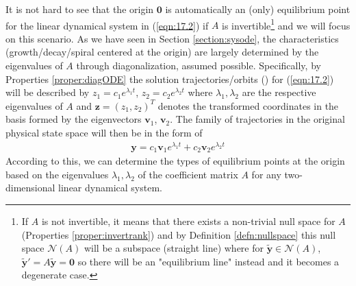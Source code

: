 It is not hard to see that the origin $\textbf{0}$ is automatically an (only) equilibrium point for the linear dynamical system in (\ref{eqn:17.2}) if $A$ is invertible\footnote{If $A$ is not invertible, it means that there exists a non-trivial null space for $A$ (Properties \ref{proper:invertrank}) and by Definition \ref{defn:nullspace} this null space $\mathcal{N}(A)$ will be a subspace (straight line) where for $\tilde{\textbf{y}} \in \mathcal{N}(A)$, $\tilde{\textbf{y}}' = A\tilde{\textbf{y}} = \textbf{0}$ so there will be an "equilibrium line" instead and it becomes a degenerate case.} and we will focus on this scenario. As we have seen in Section \ref{section:sysode}, the characteristics (growth/decay/spiral centered at the origin) are largely determined by the eigenvalues of $A$ through diagonalization, assumed possible. Specifically, by Properties \ref{proper:diagODE} the solution trajectories/orbits () for (\ref{eqn:17.2}) will be described by $z_1 = c_1e^{\lambda_1 t}$, $z_2 = c_2e^{\lambda_2 t}$ where $\lambda_1, \lambda_2$ are the respective eigenvalues of $A$ and $\textbf{z} = (z_1, z_2)^T$ denotes the transformed coordinates in the basis formed by the eigenvectors $\textbf{v}_1$, $\textbf{v}_2$. The family of trajectories in the original physical state space will then be in the form of
\begin{align}
\textbf{y} = c_1\textbf{v}_1e^{\lambda_1 t} + c_2\textbf{v}_2e^{\lambda_2 t} \label{eqn:eigendyn2d}
\end{align}
According to this, we can determine the types of equilibrium points at the origin based on the eigenvalues $\lambda_1, \lambda_2$ of the coefficient matrix $A$ for any two-dimensional linear dynamical system.
